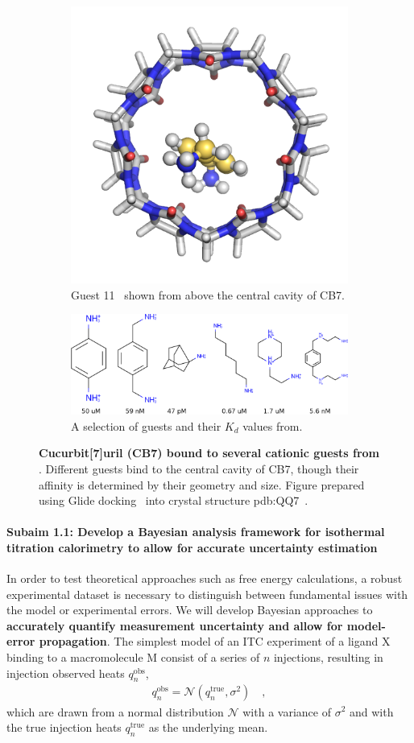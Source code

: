 \documentclass[10pt,final]{article}
\newcommand{\subsubsubsection}[1]{\paragraph*{#1}}
\begin{document}
\begin{figure}
\centering
\begin{subfigure}{.5\textwidth}
  \centering
  \includegraphics[width=.4\linewidth]{figures/guest11_top.png}
  \caption{Guest 11~\cite{Cao2013a} shown from above the central cavity of CB7.}
  \label{fig:sub1}
\end{subfigure}%
\begin{subfigure}{.5\textwidth}
  \centering
  \includegraphics[width=0.95\linewidth]{figures/Kd_guest.png}  
  \caption{A selection of guests and their $K_d$ values from\textcite{Cao2013a}.}
  \label{fig:sub2}
\end{subfigure}
\caption{\textbf{Cucurbit[7]uril (CB7) bound to several cationic guests from \textcite{Cao2013a}}. Different guests bind to the central cavity of CB7, though their affinity is determined by their geometry and size. Figure prepared using Glide docking~\cite{Halgren2004a,Friesner2004a,Friesner2006a,Schroedinger2014a} into crystal structure pdb:QQ7~\cite{Feng2004a}.}
\label{figure:host-guest}
\end{figure}

\subsubsubsection{Subaim 1.1: Develop a Bayesian analysis framework for isothermal titration calorimetry to allow for accurate uncertainty estimation}
In order to test theoretical approaches such as free energy calculations, a robust experimental dataset is necessary to distinguish between fundamental issues with the model or experimental errors. 
We will develop Bayesian approaches to \textbf{accurately quantify measurement uncertainty and allow for model-error propagation}. 
The simplest model of an ITC experiment of a ligand $\mathrm{X}$ binding to a macromolecule $\mathrm{M}$ consist of a series of $n$ injections, resulting in injection observed heats $q_n^\mathrm{obs}$,
\begin{align}
	q_n^\mathrm{obs} = \mathcal{N}(q_n^\mathrm{true}, \sigma^2) \quad ,
\end{align}
which are drawn from a normal distribution $\mathcal{N}$ with a variance of $\sigma^2$ and with the true injection heats $q_n^\mathrm{true}$ as the underlying mean.
\end{document}
